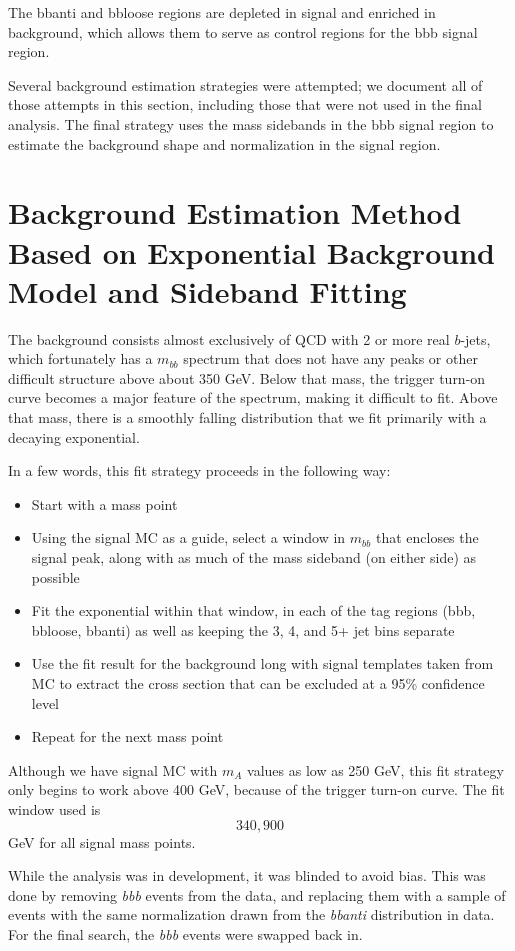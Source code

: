 The bbanti and bbloose regions are depleted in signal and enriched in background, which allows
them to serve as control regions for the bbb signal region.  

Several background estimation strategies were attempted; we document all of those attempts 
in this section, including those that were not used in the final analysis.  The final strategy
uses the mass sidebands in the bbb signal region to estimate the background shape and
normalization in the signal region.  


\section{Background Estimation Method Based on Exponential Background Model and Sideband Fitting}
The background consists almost exclusively of QCD with 2 or more real $b$-jets, which 
fortunately has a $m_{bb}$ spectrum that does not have any peaks or other difficult
structure above about 350 GeV.  Below that mass, the trigger turn-on curve becomes
a major feature of the spectrum, making it difficult to fit.  Above that mass, there
is a smoothly falling distribution that we fit primarily with a decaying exponential.

In a few words, this fit strategy proceeds in the following way:
\begin{itemize}
    \item Start with a mass point
    \item Using the signal MC as a guide, select a window in $m_{bb}$ that encloses the
signal peak, along with as much of the mass sideband (on either side) as possible
    \item Fit the exponential within that window, in each of the 
tag regions (bbb, bbloose, bbanti) as well as keeping the 3, 4, and 5+ jet bins separate
    \item Use the fit result for the background long with signal templates taken from
 MC to extract the 
cross section that can be excluded at a 95\% confidence level
    \item Repeat for the next mass point
\end{itemize}

Although we have signal MC with $m_A$ values as low as 250 GeV, this fit strategy only
begins to work above 400 GeV, because of the trigger turn-on curve.  The fit window
used is \[340,900\] GeV for all signal mass points.

While the analysis was in development, it was blinded to avoid bias.  This was done 
by removing \textit{bbb} events from the data, and replacing them with a sample of
events with the same normalization drawn from the \textit{bbanti} distribution
in data.  For the final search, the \textit{bbb} events were swapped back in.


